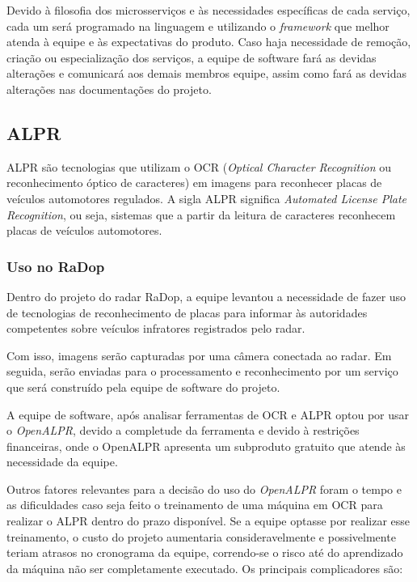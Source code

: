Devido à filosofia dos microsserviços e às necessidades específicas de cada serviço, cada um será programado na linguagem e utilizando o \textit{framework} que melhor atenda à equipe e às expectativas do produto.
Caso haja necessidade de remoção, criação ou especialização dos serviços, a equipe de software fará as devidas alterações e comunicará aos demais membros equipe, assim como fará as devidas alterações nas documentações do projeto.

\subsection{ALPR}

ALPR são tecnologias que utilizam o OCR (\textit{Optical Character Recognition} ou reconhecimento óptico de caracteres) em imagens para reconhecer placas de veículos automotores regulados. A sigla ALPR significa \textit{Automated License Plate Recognition}, ou seja, sistemas que a partir da leitura de caracteres reconhecem placas de veículos automotores.

\subsubsection{Uso no RaDop}

Dentro do projeto do radar RaDop, a equipe levantou a necessidade de fazer uso de tecnologias de reconhecimento de placas para informar às autoridades competentes sobre veículos infratores registrados pelo radar.

Com isso, imagens serão capturadas por uma câmera conectada ao radar. Em seguida, serão enviadas para o processamento e reconhecimento por um serviço que será construído pela equipe de software do projeto.

A equipe de software, após analisar ferramentas de OCR e ALPR optou por usar o \textit{OpenALPR}, devido a completude da ferramenta e devido à restrições financeiras, onde o OpenALPR apresenta um subproduto gratuito que atende às necessidade da equipe.

Outros fatores relevantes para a decisão do uso do \textit{OpenALPR} foram o tempo e as dificuldades caso seja feito o treinamento de uma máquina em OCR para realizar o ALPR dentro do prazo disponível. Se a equipe optasse por realizar esse treinamento, o custo do projeto aumentaria consideravelmente e possivelmente teriam atrasos no cronograma da equipe, correndo-se o risco até do aprendizado da máquina não ser completamente executado. Os principais complicadores são:

